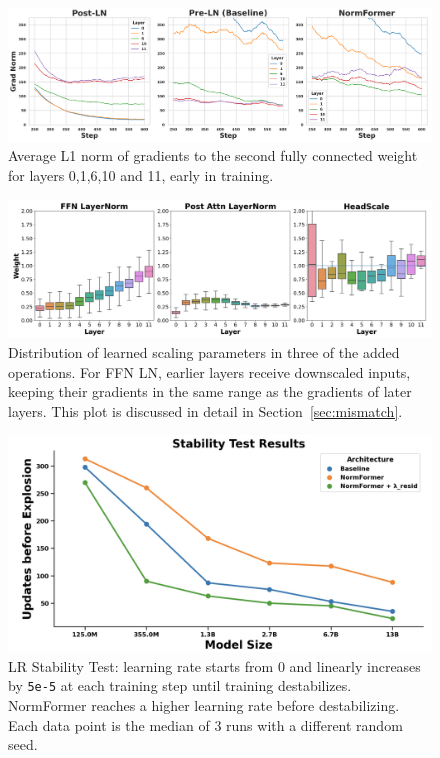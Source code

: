 \documentclass{article} %
\begin{document}
\begin{figure}[t]
\centering
\includegraphics[width=\linewidth]{gnorm_title_fix.jpg}
\caption{Average L1 norm of gradients to the second fully connected weight for layers 0,1,6,10 and 11, early in training. }
\label{fig:gnorm_fc2}
\end{figure}
\begin{figure}[t]
\centering
\includegraphics[scale=0.2]{lnweight.jpg}
\caption{Distribution of learned scaling parameters in three of the added operations. For FFN LN, earlier layers receive downscaled inputs, keeping their gradients in the same range as the gradients of later layers. This plot is discussed in detail in Section~\ref{sec:mismatch}.}
\label{fig:ffn_layernorm}
\end{figure}
\begin{figure}[ht]
\centering
\includegraphics[scale=0.25]{stab_v5.jpg}
\caption{LR Stability Test: learning rate starts from 0 and linearly increases by \texttt{5e-5} at each training step until training destabilizes. NormFormer reaches a higher learning rate before destabilizing. Each data point is the median of 3 runs with a different random seed.}
\label{fig:stability-results}
\end{figure}
\end{document}
